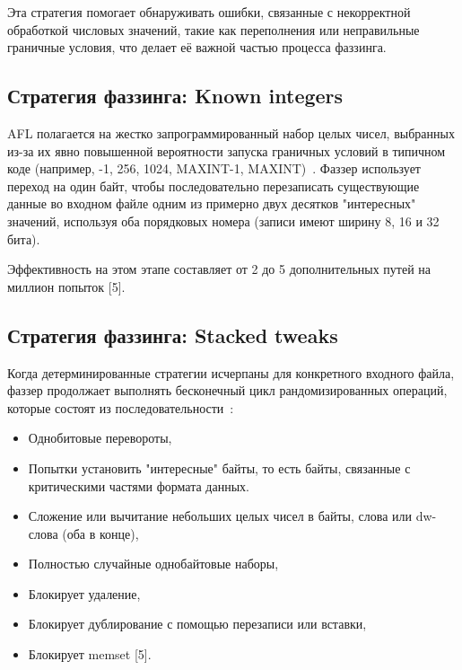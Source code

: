 Эта стратегия помогает обнаруживать ошибки, связанные с некорректной обработкой числовых значений, такие как переполнения или неправильные граничные условия, что делает её важной частью процесса фаззинга.


\subsection{Стратегия фаззинга: Known integers} \label{ch2:known-ints}
AFL полагается на жестко запрограммированный набор целых чисел, выбранных из-за их явно повышенной вероятности запуска граничных условий в типичном коде (например, -1, 256, 1024, MAX\textunderscore INT-1, MAX\textunderscore INT)~\cite{???}. Фаззер использует переход на один байт, чтобы последовательно перезаписать существующие данные во входном файле одним из примерно двух десятков "интересных" значений, используя оба порядковых номера (записи имеют ширину 8, 16 и 32 бита).


Эффективность на этом этапе составляет от 2 до 5 дополнительных путей на миллион попыток [5].

\subsection{Стратегия фаззинга: Stacked tweaks} \label{ch2:stacked-tweaks}
Когда детерминированные стратегии исчерпаны для конкретного входного файла, фаззер продолжает выполнять бесконечный цикл рандомизированных операций, которые состоят из последовательности~\cite{???}:

\begin{itemize}
	\item Однобитовые перевороты,
	\item Попытки установить "интересные" байты, то есть байты, связанные с критическими частями формата данных.
	\item Сложение или вычитание небольших целых чисел в байты, слова или dw-слова (оба в конце),
	\item Полностью случайные однобайтовые наборы,
	\item Блокирует удаление,
	\item Блокирует дублирование с помощью перезаписи или вставки,
	\item Блокирует memset [5].
\end{itemize}

